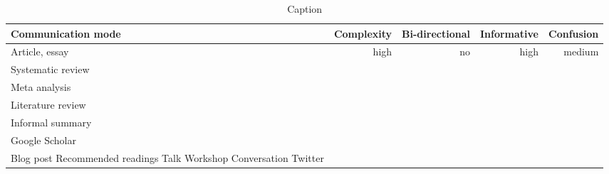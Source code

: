 \begin{table*}\centering
{}
\begin{tabular}{@{}lrrrr@{}}\toprule
Communication mode & Complexity & Bi-directional & Informative  & Confusion
\\\midrule
Article, essay & high & no & high & medium  \\
Systematic review \\
Meta analysis \\
Literature review \\
Informal summary \\
Google Scholar \\
Blog post
Recommended readings
Talk
Workshop
Conversation
Twitter


\bottomrule
\end{tabular}
\caption{Caption}
\end{table*}